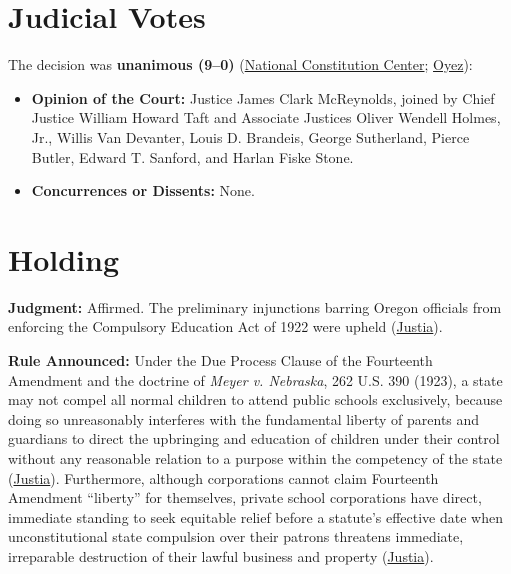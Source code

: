\documentclass[12pt]{article}
\begin{document}
\section{Judicial Votes}
The decision was \textbf{unanimous (9--0)} (\href{https://constitutioncenter.org/the-constitution/supreme-court-case-library/pierce-v-society-of-sisters}{National Constitution Center}; \href{https://www.oyez.org/cases/1900-1940/268us510}{Oyez}):
\begin{itemize}
    \item \textbf{Opinion of the Court:} Justice James Clark McReynolds, joined by Chief Justice William Howard Taft and Associate Justices Oliver Wendell Holmes, Jr., Willis Van Devanter, Louis D. Brandeis, George Sutherland, Pierce Butler, Edward T. Sanford, and Harlan Fiske Stone.
    \item \textbf{Concurrences or Dissents:} None.
\end{itemize}

\section{Holding}
\textbf{Judgment:} Affirmed. The preliminary injunctions barring Oregon officials from enforcing the Compulsory Education Act of 1922 were upheld (\href{https://supreme.justia.com/cases/federal/us/268/510/}{Justia}).

\textbf{Rule Announced:} Under the Due Process Clause of the Fourteenth Amendment and the doctrine of \textit{Meyer v. Nebraska}, 262 U.S. 390 (1923), a state may not compel all normal children to attend public schools exclusively, because doing so unreasonably interferes with the fundamental liberty of parents and guardians to direct the upbringing and education of children under their control without any reasonable relation to a purpose within the competency of the state (\href{https://supreme.justia.com/cases/federal/us/268/510/}{Justia}). Furthermore, although corporations cannot claim Fourteenth Amendment ``liberty'' for themselves, private school corporations have direct, immediate standing to seek equitable relief before a statute's effective date when unconstitutional state compulsion over their patrons threatens immediate, irreparable destruction of their lawful business and property (\href{https://supreme.justia.com/cases/federal/us/268/510/}{Justia}).
\end{document}
